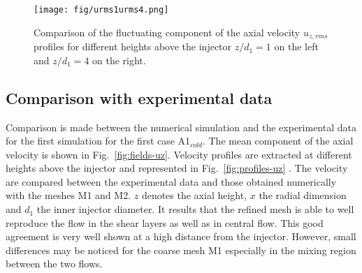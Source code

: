 \documentclass[twocolumn,10pt]{asme2e}
\begin{document}
\begin{figure}
       \centering
       \texttt{[image: fig/urms1urms4.png]}
   \caption{Comparison of the fluctuating component of the axial velocity $u_{z,rms}$ profiles for different heights above the injector $z/d_1=1$ on the left and $z/d_1=4$ on the right.}
   \label{fig:profiles-urms}
\end{figure}


\subsection*{Comparison with experimental data}


Comparison is made between the numerical simulation and the experimental data for the first simulation for the first case A1$_{cold}$. The mean component of the axial velocity is shown in Fig.~\ref{fig:fields-uz}. Velocity profiles are extracted at different heights above the injector and represented in Fig.~\ref{fig:profiles-uz} . The velocity are compared between the experimental data and those obtained numerically with the meshes M1 and M2. $z$ denotes the axial height, $x$ the radial dimension and $d_1$ the inner injector diameter. It results that the refined mesh is able to well reproduce the flow in the shear layers as well as in central flow. This good agreement is very well shown at a high distance from the injector. However, small differences may be noticed for the coarse mesh M1 especially in the mixing region between the two flows. 
\end{document}
